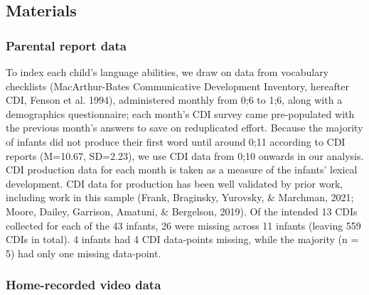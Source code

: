 \documentclass[
  man,floatsintext]{apa6}
\begin{document}
\hypertarget{materials}{%
\subsection{Materials}\label{materials}}

\hypertarget{parental-report-data}{%
\subsubsection{Parental report data}\label{parental-report-data}}

To index each child's language abilities, we draw on data from vocabulary checklists (MacArthur-Bates Communicative Development Inventory, hereafter CDI, Fenson et al. 1994), administered monthly from 0;6 to 1;6, along with a demographics questionnaire; each month's CDI survey came pre-populated with the previous month's answers to save on reduplicated effort. Because the majority of infants did not produce their first word until around 0;11 according to CDI reports (M=10.67, SD=2.23), we use CDI data from 0;10 onwards in our analysis. CDI production data for each month is taken as a measure of the infants' lexical development. CDI data for production has been well validated by prior work, including work in this sample (Frank, Braginsky, Yurovsky, \& Marchman, 2021; Moore, Dailey, Garrison, Amatuni, \& Bergelson, 2019). Of the intended 13 CDIs collected for each of the 43 infants, 26 were missing across 11 infants (leaving 559 CDIs in total). 4 infants had 4 CDI data-points missing, while the majority (n = 5) had only one missing data-point.

\hypertarget{home-recorded-video-data}{%
\subsubsection{Home-recorded video data}\label{home-recorded-video-data}}
\end{document}
